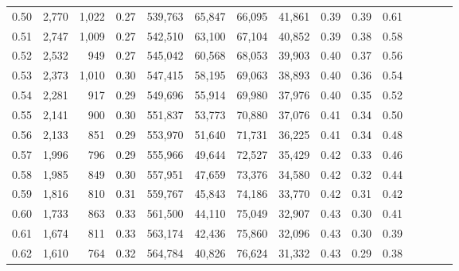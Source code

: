 \begin{tabular}{rrrcrrrrrrrrrrr}
0.50 &   2,770 &   1,022 &                                       0.27 &  539,763 &   65,847 &   66,095 &   41,861 &  0.39 &  0.39 &                         0.61 \\
0.51 &   2,747 &   1,009 &                                       0.27 &  542,510 &   63,100 &   67,104 &   40,852 &  0.39 &  0.38 &                         0.58 \\
0.52 &   2,532 &     949 &                                       0.27 &  545,042 &   60,568 &   68,053 &   39,903 &  0.40 &  0.37 &                         0.56 \\
0.53 &   2,373 &   1,010 &                                       0.30 &  547,415 &   58,195 &   69,063 &   38,893 &  0.40 &  0.36 &                         0.54 \\
0.54 &   2,281 &     917 &                                       0.29 &  549,696 &   55,914 &   69,980 &   37,976 &  0.40 &  0.35 &                         0.52 \\
0.55 &   2,141 &     900 &                                       0.30 &  551,837 &   53,773 &   70,880 &   37,076 &  0.41 &  0.34 &                         0.50 \\
0.56 &   2,133 &     851 &                                       0.29 &  553,970 &   51,640 &   71,731 &   36,225 &  0.41 &  0.34 &                         0.48 \\
0.57 &   1,996 &     796 &                                       0.29 &  555,966 &   49,644 &   72,527 &   35,429 &  0.42 &  0.33 &                         0.46 \\
0.58 &   1,985 &     849 &                                       0.30 &  557,951 &   47,659 &   73,376 &   34,580 &  0.42 &  0.32 &                         0.44 \\
0.59 &   1,816 &     810 &                                       0.31 &  559,767 &   45,843 &   74,186 &   33,770 &  0.42 &  0.31 &                         0.42 \\
0.60 &   1,733 &     863 &                                       0.33 &  561,500 &   44,110 &   75,049 &   32,907 &  0.43 &  0.30 &                         0.41 \\
0.61 &   1,674 &     811 &                                       0.33 &  563,174 &   42,436 &   75,860 &   32,096 &  0.43 &  0.30 &                         0.39 \\
0.62 &   1,610 &     764 &                                       0.32 &  564,784 &   40,826 &   76,624 &   31,332 &  0.43 &  0.29 &                         0.38 \\

\end{tabular}
